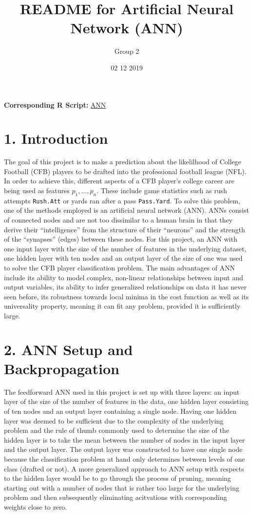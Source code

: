 \documentclass[]{article}
\title{README for Artificial Neural Network (ANN)}
\author{Group 2}
\date{02 12 2019}
\begin{document}
\maketitle

\textbf{Corresponding R Script:}
\href{https://github.com/NicSchuler/DSF_NFLDraftPrediction/blob/master/Project_Scripts/ANN.R}{ANN}

\hypertarget{introduction}{%
\section{1. Introduction}\label{introduction}}

The goal of this project is to make a prediction about the likelilhood
of College Football (CFB) players to be drafted into the professional
football league (NFL). In order to achieve this, different aspects of a
CFB player's college career are being used as features
\(p_{1}, ..., p_{n}\). These include game statistics such as rush
attempts \texttt{Rush.Att} or yards ran after a pass \texttt{Pass.Yard}.
To solve this problem, one of the methods employed is an artificial
neural network (ANN). ANNs consist of connected nodes and are not too
dissimilar to a human brain in that they derive their ``intelligence''
from the structure of their ``neurons'' and the strength of the
``synapses'' (edges) between these nodes. For this project, an ANN with
one input layer with the size of the number of features in the
underlying dataset, one hidden layer with ten nodes and an output layer
of the size of one was used to solve the CFB player classification
problem. The main advantages of ANN include its ability to model
complex, non-linear relationships between input and output variables,
its ability to infer generalized relationships on data it has never seen
before, its robustness towards local minima in the cost function as well
as its universality property, meaning it can fit any problem, provided
it is sufficiently large.

\hypertarget{ann-setup-and-backpropagation}{%
\section{2. ANN Setup and
Backpropagation}\label{ann-setup-and-backpropagation}}

The feedforward ANN used in this project is set up with three layers: an
input layer of the size of the number of features in the data, one
hidden layer consisting of ten nodes and an output layer containing a
single node. Having one hidden layer was deemed to be sufficient due to
the complexity of the underlying problem and the rule of thumb commonly
used to determine the size of the hidden layer is to take the mean
between the number of nodes in the input layer and the output layer. The
output layer was constructed to have one single node because the
classification problem at hand only determines between levels of one
class (drafted or not). A more generalized approach to ANN setup with
respects to the hidden layer would be to go through the process of
pruning, meaning starting out with a number of nodes that is rather too
large for the underlying problem and then subsequently eliminating
acitvations with corresponding weights close to zero.
\end{document}
